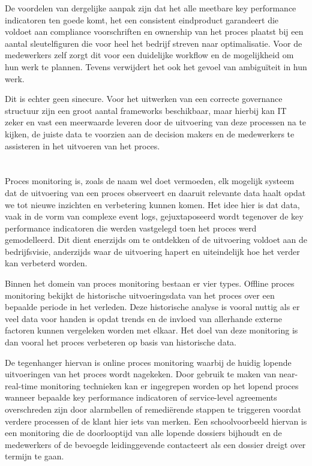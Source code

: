 De voordelen van dergelijke aanpak zijn dat het alle meetbare key performance indicatoren ten goede komt, het een consistent eindproduct garandeert die voldoet aan compliance voorschriften en ownership van het proces plaatst bij een aantal sleutelfiguren die voor heel het bedrijf streven naar optimalisatie. Voor de medewerkers zelf zorgt dit voor een duidelijke workflow en de mogelijkheid om hun werk te plannen. Tevens verwijdert het ook het gevoel van ambiguïteit in hun werk. \autocite[p. 7]{Braganza2000} \newline

Dit is echter geen sinecure. Voor het uitwerken van een correcte governance structuur zijn een groot aantal frameworks beschikbaar, maar hierbij kan IT zeker en vast een meerwaarde leveren door de uitvoering van deze processen na te kijken, de juiste data te voorzien aan de decision makers en de medewerkers te assisteren in het uitvoeren van het proces. \newline

\section{}%
\label{sec:proces monitoring}
Proces monitoring is, zoals de naam wel doet vermoeden, elk mogelijk systeem dat de uitvoering van een proces observeert en daaruit relevante data haalt opdat we tot nieuwe inzichten en verbetering kunnen komen. Het idee hier is dat data, vaak in de vorm van complexe event logs, gejuxtaposeerd wordt tegenover de key performance indicatoren die werden vastgelegd toen het proces werd gemodelleerd. Dit dient enerzijds om te ontdekken of de uitvoering voldoet aan de bedrijfsvisie, anderzijds waar de uitvoering hapert en uiteindelijk hoe het verder kan verbeterd worden. \autocite[pp. 413-414]{Dumas2018} \newline

Binnen het domein van proces monitoring bestaan er vier types. Offline proces monitoring bekijkt de historische uitvoeringsdata van het proces over een bepaalde periode in het verleden. Deze historische analyse is vooral nuttig als er veel data voor handen is opdat trends en de invloed van allerhande externe factoren kunnen vergeleken worden met elkaar. Het doel van deze monitoring is dan vooral het proces verbeteren op basis van historische data. \newline

De tegenhanger hiervan is online proces monitoring waarbij de huidig lopende uitvoeringen van het proces wordt nagekeken. Door gebruik te maken van near-real-time monitoring technieken kan er ingegrepen worden op het lopend proces wanneer bepaalde key performance indicatoren of service-level agreements overschreden zijn door alarmbellen of remediërende stappen te triggeren voordat verdere processen of de klant hier iets van merken. Een schoolvoorbeeld hiervan is een monitoring die de doorlooptijd van alle lopende dossiers bijhoudt en de medewerkers of de bevoegde leidinggevende contacteert als een dossier dreigt over termijn te gaan. \newline

